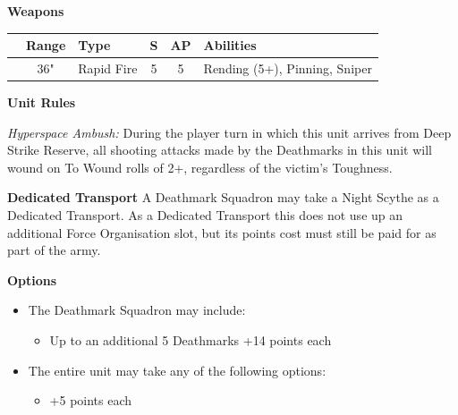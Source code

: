 \begin{minipage}[t]{0.72\textwidth}
	\vspace*{2em}
	\textbf{Weapons}
	
	\begin{tabular}{L{90 pt} c C{40pt} *{2}{c} >{\raggedright\arraybackslash}p{130pt}}
		& Range & Type & S & AP & Abilities \\
		\hline
		 & 36" & Rapid Fire & 5 & 5 & Rending (5+), Pinning, Sniper \\
	\end{tabular}
	
	\vspace*{2em}
	\textbf{Unit Rules}
	
	\textit{Hyperspace Ambush:}  During the player turn in which this unit arrives from Deep Strike Reserve, all shooting attacks made by the Deathmarks in this unit will wound on To Wound rolls of 2+, regardless of the victim’s Toughness.
	
	\vspace*{2em}
	\textbf{Dedicated Transport}
	A Deathmark Squadron may take a Night Scythe as a Dedicated Transport. As a Dedicated Transport this does not use up an additional Force Organisation slot, but its points cost must still be paid for as part of the army.
	
	\vspace*{2em}
	\textbf{Options}
	\begin{itemize}
		\item The Deathmark Squadron may include:
		\begin{itemize}
			\item Up to an additional 5 Deathmarks \dotfill +14 points each
		\end{itemize}
		\item The entire unit may take any of the following options:
		\begin{itemize}
			\item {} \dotfill +5 points each
		\end{itemize}
	\end{itemize}
\end{minipage}
\hspace{0.5em}


\newpage
\subsubsection[C'tan Shard of Aza'gorod, the Nightbringer]{}

